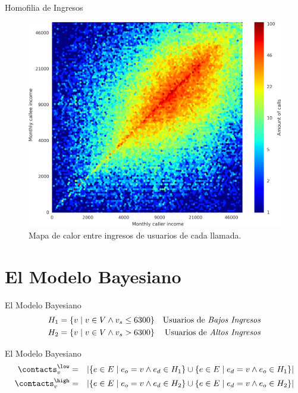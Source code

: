 \documentclass[usenames,dvipsnames,table]{beamer}
\begin{document}
\begin{frame}{Homofilia de Ingresos}
	\begin{figure}
		\includegraphics[width=.8\framewidth,height=.75\textheight,keepaspectratio]{heatmap.png}
		\caption{Mapa de calor entre ingresos de usuarios de cada llamada.}
	\end{figure}
\end{frame}

\section{El Modelo Bayesiano}

\begin{frame}{El Modelo Bayesiano}
	\begin{align*}
		H_1 &= \left\{ v \mid v \in V \wedge v_s \leq 6300 \right\} &\text{Usuarios de \emph{Bajos Ingresos}} \\
		H_2 &= \left\{ v \mid v \in V \wedge v_s >    6300 \right\} &\text{Usuarios de \emph{Altos Ingresos}}
	\end{align*}
\end{frame}

\begin{frame}{El Modelo Bayesiano}
	\begin{align*}
		\contacts^{\low}_v &= &\left| \left\{ e \in E \mid e_o = v \land e_d \in H_1 \right\} \cup \left\{ e \in E \mid e_d = v \land e_o \in H_1 \right\} \right| \\
		\contacts^{\high}_v &= &\left| \left\{ e \in E \mid e_o = v \land e_d \in H_2 \right\} \cup \left\{ e \in E \mid e_d = v \land e_o \in H_2 \right\} \right|
	\end{align*}
\end{frame}
\end{document}
